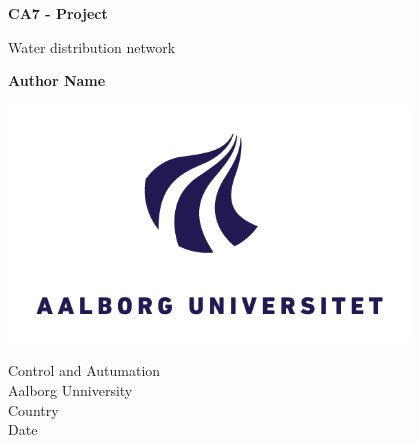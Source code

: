 \begin{titlepage}
   \begin{center}
       \vspace*{1cm}

       \textbf{CA7 - Project}

       \vspace{0.5cm}
        Water distribution network
            
       \vspace{1.5cm}

       \textbf{Author Name}

       \vfill
            
        
            
       \vspace{0.8cm}
     
       \includegraphics[width=0.8\textwidth]{Pictures/aaulogo.png}
            
       Control and Autumation\\
       Aalborg Unniversity\\
       Country\\
       Date
            
   \end{center}
\end{titlepage}